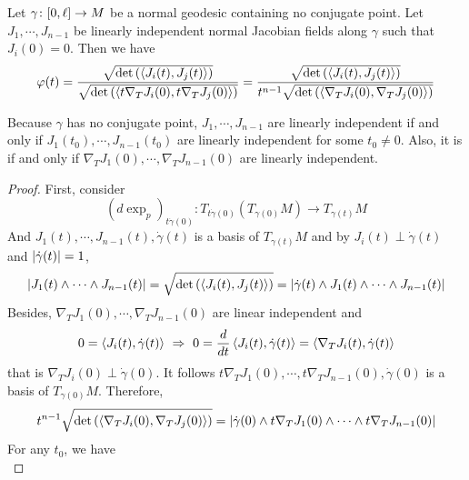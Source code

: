 \begin{enumerate}[label=\arabic{*}]
	\begin{lem}\label{lem:indepjac}
		Let $\gamma \colon [0,\ell] \rightarrow M$ be a normal geodesic containing no conjugate point. Let $J_1,\cdots,J_{n-1}$ be linearly independent normal Jacobian fields along $\gamma$ such that $J_i(0) = 0$. Then we have
		\begin{equation*}
			\varphi(t) = \frac{\sqrt{\det\left(\left\langle J_i(t),J_j(t) \right\rangle\right)}}{\sqrt{\det\left(\left\langle t\nabla_TJ_i(0),t\nabla_TJ_j(0) \right\rangle\right)}} = \frac{\sqrt{\det\left(\left\langle J_i(t),J_j(t) \right\rangle\right)}}{t^{n-1}\sqrt{\det\left(\left\langle \nabla_TJ_i(0),\nabla_TJ_j(0) \right\rangle\right)}}
		\end{equation*}
	\end{lem}
	\begin{rmk}
		Because $\gamma$ has no conjugate point, $J_1,\cdots,J_{n-1}$ are linearly independent if and only if $J_1(t_0),\cdots,J_{n-1}(t_0)$ are linearly independent for some $t_0 \neq 0$. Also, it is if and only if $\nabla_TJ_1(0),\cdots,\nabla_TJ_{n-1}(0)$ are linearly independent. 
	\end{rmk}
	\begin{proof}
		First, consider
		\begin{equation*}
			(d\exp_p)_{t\dot{\gamma}(0)} \colon T_{t\dot{\gamma}(0)}(T_{\gamma(0)}M) \longrightarrow T_{\gamma(t)}M
		\end{equation*}
		And $J_1(t),\cdots,J_{n-1}(t),\dot{\gamma}(t)$ is a basis of $T_{\gamma(t)}M$ and by $J_i(t) \perp \dot{\gamma}(t)$ and $\left\lvert\dot{\gamma}(t)\right\lvert=1$,
		\begin{equation*}
			\left\lvert J_1(t)\wedge \cdots \wedge J_{n-1}(t)\right\lvert = \sqrt{\det\left(\left\langle J_i(t),J_j(t) \right\rangle\right)} =  \left\lvert\dot{\gamma}(t)\wedge J_1(t)\wedge \cdots \wedge J_{n-1}(t)\right\lvert
		\end{equation*}
		Besides, $\nabla_TJ_1(0),\cdots,\nabla_TJ_{n-1}(0)$ are linear independent and
		\begin{equation*}
			0 = \left\langle J_i(t),\dot{\gamma}(t) \right\rangle ~\Rightarrow~ 0=\frac{d}{dt}\left\langle J_i(t),\dot{\gamma}(t) \right\rangle = \left\langle \nabla_TJ_i(t),\dot{\gamma}(t) \right\rangle
		\end{equation*}
		that is $\nabla_TJ_i(0) \perp \dot{\gamma}(0)$. It follows $t\nabla_TJ_1(0),\cdots,t\nabla_TJ_{n-1}(0),\dot{\gamma}(0)$ is a basis of $T_{\gamma(0)}M$. Therefore,
		\begin{equation*}
			t^{n-1}\sqrt{\det\left(\left\langle \nabla_TJ_i(0),\nabla_TJ_j(0) \right\rangle\right)}= \left\lvert\dot{\gamma}(0) \wedge t\nabla_TJ_1(0)\wedge \cdots \wedge t\nabla_TJ_{n-1}(0)\right\lvert
		\end{equation*}
		For any $t_0$, we have 
		\begin{equation*}

\end{equation*}
\end{proof}
\end{enumerate}
